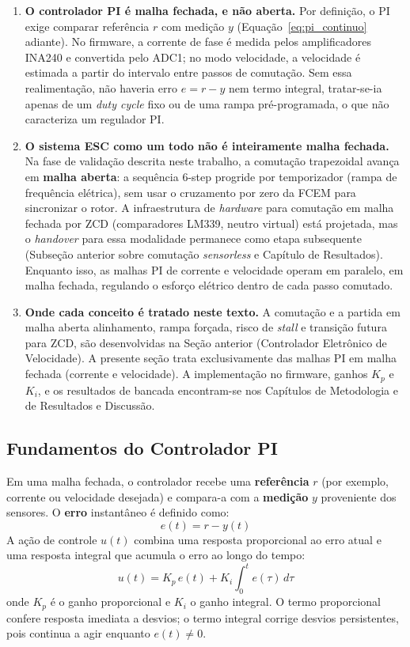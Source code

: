 \begin{enumerate}
    \item \textbf{O controlador PI é malha fechada, e não aberta.} Por definição, o PI exige comparar referência $r$ com medição $y$ (Equação~\ref{eq:pi_continuo} adiante). No firmware, a corrente de fase é medida pelos amplificadores INA240 e convertida pelo ADC1; no modo velocidade, a velocidade é estimada a partir do intervalo entre passos de comutação. Sem essa realimentação, não haveria erro $e = r - y$ nem termo integral, tratar-se-ia apenas de um \textit{duty cycle} fixo ou de uma rampa pré-programada, o que não caracteriza um regulador PI.
    \item \textbf{O sistema ESC como um todo não é inteiramente malha fechada.} Na fase de validação descrita neste trabalho, a comutação trapezoidal avança em \textbf{malha aberta}: a sequência 6-step progride por temporizador (rampa de frequência elétrica), sem usar o cruzamento por zero da FCEM para sincronizar o rotor. A infraestrutura de \textit{hardware} para comutação em malha fechada por ZCD (comparadores LM339, neutro virtual) está projetada, mas o \textit{handover} para essa modalidade permanece como etapa subsequente (Subseção anterior sobre comutação \textit{sensorless} e Capítulo de Resultados). Enquanto isso, as malhas PI de corrente e velocidade operam em paralelo, em malha fechada, regulando o esforço elétrico dentro de cada passo comutado.
    \item \textbf{Onde cada conceito é tratado neste texto.} A comutação e a partida em malha aberta alinhamento, rampa forçada, risco de \textit{stall} e transição futura para ZCD, são desenvolvidas na Seção anterior (Controlador Eletrônico de Velocidade). A presente seção trata exclusivamente das malhas PI em malha fechada (corrente e velocidade). A implementação no firmware, ganhos $K_p$ e $K_i$, e os resultados de bancada encontram-se nos Capítulos de Metodologia e de Resultados e Discussão.
\end{enumerate}

\subsection{Fundamentos do Controlador PI}

Em uma malha fechada, o controlador recebe uma \textbf{referência} $r$ (por exemplo, corrente ou velocidade desejada) e compara-a com a \textbf{medição} $y$ proveniente dos sensores. O \textbf{erro} instantâneo é definido como:
\begin{equation}
    e(t) = r - y(t)
\end{equation}
A ação de controle $u(t)$ combina uma resposta proporcional ao erro atual e uma resposta integral que acumula o erro ao longo do tempo:
\begin{equation}
    u(t) = K_p \, e(t) + K_i \int_0^t e(\tau) \, d\tau
    \label{eq:pi_continuo}
\end{equation}
onde $K_p$ é o ganho proporcional e $K_i$ o ganho integral. O termo proporcional confere resposta imediata a desvios; o termo integral corrige desvios persistentes, pois continua a agir enquanto $e(t) \neq 0$.

